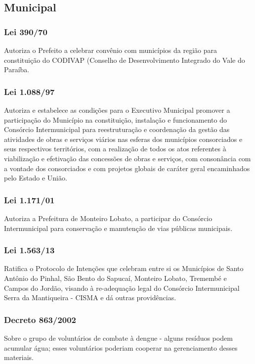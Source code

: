 \begin{subapend}
	\subsection{Municipal}
	\begin{subsubapend}
		\subsubsection{Lei 390/70}
		Autoriza o Prefeito a celebrar convênio com municípios da região para constituição do CODIVAP (Conselho de Desenvolvimento Integrado do Vale do Paraíba.
		\subsubsection{Lei 1.088/97}
		Autoriza e estabelece as condições para o Executivo Municipal promover a participação do Município na constituição, instalação e funcionamento do Consórcio Intermunicipal para reestruturação e coordenação da gestão das atividades de obras e serviços viários nas esferas dos municípios consorciados e seus respectivos territórios, com a realização de todos os atos referentes à viabilização e efetivação das concessões de obras e serviços, com consonância com a vontade dos consorciados e com projetos globais de caráter geral encaminhados pelo Estado e União.
		\subsubsection{Lei 1.171/01}
		Autoriza a Prefeitura de Monteiro Lobato, a participar do Consórcio Intermunicipal para conservação e manutenção de vias públicas municipais.
		\subsubsection{Lei 1.563/13}
		Ratifica o Protocolo de Intenções que celebram entre si os Municípios de Santo Antônio do Pinhal, São Bento do Sapucaí, Monteiro Lobato, Tremembé e Campos do Jordão, visando à re-adequação legal do Consórcio Intermunicipal Serra da Mantiqueira - CISMA e dá outras providências.
		\subsubsection{Decreto 863/2002}
		Sobre o grupo de voluntários de combate à dengue - alguns resíduos podem acumular água; esses voluntários poderiam cooperar na gerenciamento desses materiais.
	\end{subsubapend}
\end{subapend}

